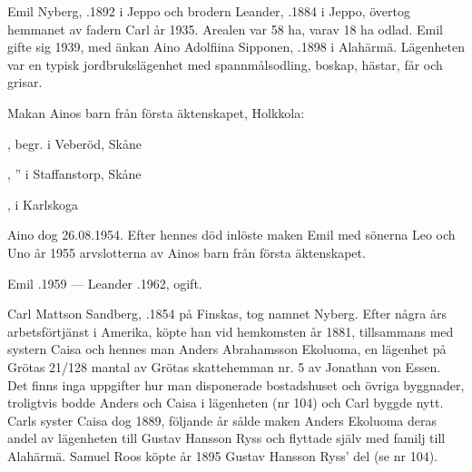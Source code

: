 %
Emil Nyberg, .1892 i Jeppo och brodern Leander, .1884 i Jeppo, övertog hemmanet av fadern Carl år 1935. Arealen var 58 ha, varav 18 ha odlad. Emil gifte sig 1939, med änkan Aino Adolfiina Sipponen, .1898 i Alahärmä. Lägenheten var en typisk jordbrukslägenhet med spannmålsodling, boskap, hästar, får och grisar.
\begin{jhchildren}
  \item {}
  \item {}
\end{jhchildren}

Makan Ainos barn från första äktenskapet, Holkkola:
\begin{jhchildren}
  \item {}, begr. i Veberöd, Skåne
  \item {}, '' i Staffanstorp, Skåne
  \item {}, i Karlskoga
\end{jhchildren}

Aino dog 26.08.1954. Efter hennes död inlöste maken Emil med sönerna Leo och Uno år 1955 arvslotterna av Ainos barn från  första äktenskapet.

Emil .1959  ---  Leander .1962, ogift.


%
Carl Mattson Sandberg, .1854 på Finskas, tog namnet Nyberg. Efter några års arbetsförtjänst i Amerika, köpte han vid hemkomsten år 1881, tillsammans med systern Caisa och hennes man Anders Abrahamsson Ekoluoma, en lägenhet på Grötas 21/128 mantal av Grötas skattehemman nr. 5 av Jonathan von Essen. Det finns inga uppgifter hur man disponerade bostadshuset och övriga byggnader, troligtvis bodde Anders och Caisa i lägenheten (nr 104) och Carl byggde nytt. Carls syster Caisa dog 1889, följande år sålde maken Anders Ekoluoma deras andel av lägenheten till Gustav Hansson Ryss och flyttade själv med familj till Alahärmä. Samuel Roos köpte år 1895 Gustav Hansson Ryss' del (se nr 104).

